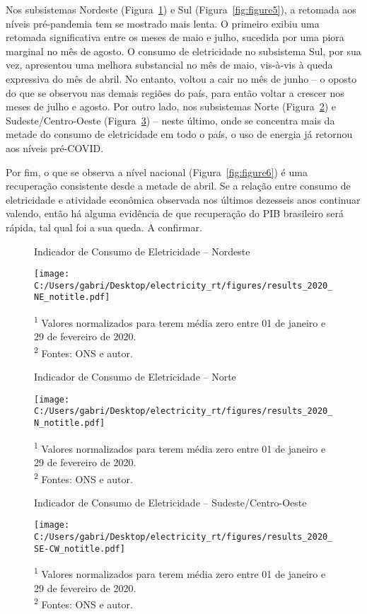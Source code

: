 \documentclass[12pt]{article}
\begin{document}
Nos subsistemas Nordeste (Figura~{\ref{fig:figure2}}) e Sul (Figura~{\ref{fig:figure5}}), a retomada aos níveis pré-pandemia tem se mostrado mais lenta. O primeiro exibiu uma retomada significativa entre os meses de maio e julho, sucedida por uma piora marginal no mês de agosto. O consumo de eletricidade no subsistema Sul, por sua vez, apresentou uma melhora substancial no mês de maio, vis-à-vis à queda expressiva do mês de abril. No entanto, voltou a cair no mês de junho -- o oposto do que se observou nas demais regiões do país, para então voltar a crescer nos meses de julho e agosto. Por outro lado, nos subsistemas Norte (Figura~{\ref{fig:figure3}}) e Sudeste/Centro-Oeste (Figura~{\ref{fig:figure4}}) -- neste último, onde se concentra mais da metade do consumo de eletricidade em todo o país, o uso de energia já retornou aos níveis pré-COVID. 

Por fim, o que se observa a nível nacional (Figura~{\ref{fig:figure6}}) é uma recuperação consistente desde a metade de abril. Se a relação entre consumo de eletricidade e atividade econômica observada nos últimos dezesseis anos continuar valendo, então há alguma evidência de que recuperação do PIB brasileiro será rápida, tal qual foi a sua queda. A confirmar.

\pagebreak

\begin{figure}[!htb]
	\centering
	\caption{Indicador de Consumo de Eletricidade -- Nordeste}
	\label{fig:figure2}
	\texttt{[image: C:/Users/gabri/Desktop/electricity\_rt/figures/results\_2020\_NE\_notitle.pdf]}
	\caption*{\textsuperscript{1} Valores normalizados para terem média zero entre 01 de janeiro e 29 de fevereiro de 2020. \\ \textsuperscript{2} Fontes: ONS e autor.}
\end{figure}

\begin{figure}[!htb]
	\centering
	\caption{Indicador de Consumo de Eletricidade -- Norte}
	\label{fig:figure3}
	\texttt{[image: C:/Users/gabri/Desktop/electricity\_rt/figures/results\_2020\_N\_notitle.pdf]}
	\caption*{\textsuperscript{1} Valores normalizados para terem média zero entre 01 de janeiro e 29 de fevereiro de 2020. \\ \textsuperscript{2} Fontes: ONS e autor.}
\end{figure}

\begin{figure}[!htb]
	\centering
	\caption{Indicador de Consumo de Eletricidade -- Sudeste/Centro-Oeste}
	\label{fig:figure4}
	\texttt{[image: C:/Users/gabri/Desktop/electricity\_rt/figures/results\_2020\_SE-CW\_notitle.pdf]}
	\caption*{\textsuperscript{1} Valores normalizados para terem média zero entre 01 de janeiro e 29 de fevereiro de 2020. \\ \textsuperscript{2} Fontes: ONS e autor.}
\end{figure}
\end{document}
